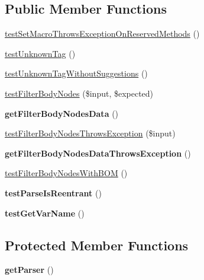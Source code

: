 \subsection*{Public Member Functions}
\begin{DoxyCompactItemize}
\item 
\hyperlink{classTwig__Tests__ParserTest_ac03e1f5febce13515df00cada1243a6b}{test\+Set\+Macro\+Throws\+Exception\+On\+Reserved\+Methods} ()
\item 
\hyperlink{classTwig__Tests__ParserTest_aba8ff8e8695cef0ea6a99b09300cd880}{test\+Unknown\+Tag} ()
\item 
\hyperlink{classTwig__Tests__ParserTest_a15ecc6ed785f5373d65b65edf48bad21}{test\+Unknown\+Tag\+Without\+Suggestions} ()
\item 
\hyperlink{classTwig__Tests__ParserTest_a479f076b0f5d5051b064fc91e4a4d15c}{test\+Filter\+Body\+Nodes} (\$input, \$expected)
\item 
{\bfseries get\+Filter\+Body\+Nodes\+Data} ()\hypertarget{classTwig__Tests__ParserTest_afa8f2b6b055fc5396279f66617fd8bc5}{}\label{classTwig__Tests__ParserTest_afa8f2b6b055fc5396279f66617fd8bc5}

\item 
\hyperlink{classTwig__Tests__ParserTest_a42463fd4fc6e203ad1187519c3b9552b}{test\+Filter\+Body\+Nodes\+Throws\+Exception} (\$input)
\item 
{\bfseries get\+Filter\+Body\+Nodes\+Data\+Throws\+Exception} ()\hypertarget{classTwig__Tests__ParserTest_a39640052f349ad18257c37315f54d1e3}{}\label{classTwig__Tests__ParserTest_a39640052f349ad18257c37315f54d1e3}

\item 
\hyperlink{classTwig__Tests__ParserTest_a356c5cedf51dfa0db5e7c4cd990940c9}{test\+Filter\+Body\+Nodes\+With\+B\+OM} ()
\item 
{\bfseries test\+Parse\+Is\+Reentrant} ()\hypertarget{classTwig__Tests__ParserTest_ab5845c7034be7b9ed9f3d099b4d4e115}{}\label{classTwig__Tests__ParserTest_ab5845c7034be7b9ed9f3d099b4d4e115}

\item 
{\bfseries test\+Get\+Var\+Name} ()\hypertarget{classTwig__Tests__ParserTest_ac07c4133192d5f72ef99266f49edde0e}{}\label{classTwig__Tests__ParserTest_ac07c4133192d5f72ef99266f49edde0e}

\end{DoxyCompactItemize}
\subsection*{Protected Member Functions}
\begin{DoxyCompactItemize}
\item 
{\bfseries get\+Parser} ()\hypertarget{classTwig__Tests__ParserTest_a8218db8566966bbbf2c5570581cd29a4}{}\label{classTwig__Tests__ParserTest_a8218db8566966bbbf2c5570581cd29a4}

\end{DoxyCompactItemize}


